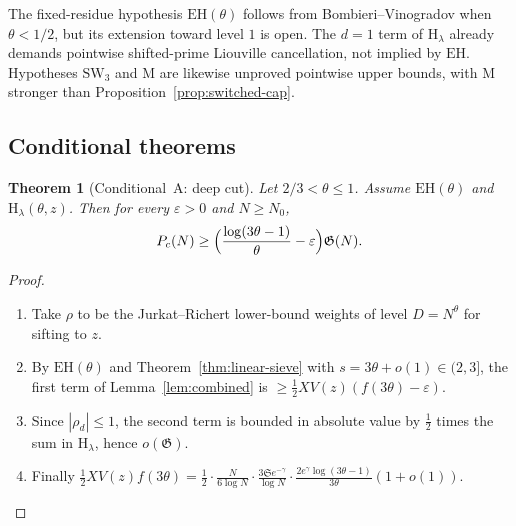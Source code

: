 \documentclass[final,11pt]{elsarticle}
\newtheorem{theorem}{Theorem}[section]
\theoremstyle{definition}
\theoremstyle{remark}
\newcommand{\Sg}{\mathfrak{S}}
\newcommand{\GG}{\mathfrak{G}}
\newcommand{\eps}{\varepsilon}
\numberwithin{equation}{section}
\begin{document}
The fixed-residue hypothesis $\mathrm{EH}(\theta)$ follows from
Bombieri--Vinogradov when $\theta<1/2$, but its extension toward level
$1$ is open. The $d=1$ term of $\mathrm H_\lambda$ already demands
pointwise shifted-prime Liouville cancellation, not implied by
$\mathrm{EH}$. Hypotheses $\mathrm{SW}_3$ and $\mathrm M$ are likewise
unproved pointwise upper bounds, with $\mathrm M$ stronger than
Proposition~\ref{prop:switched-cap}.

\subsection{Conditional theorems}

\begin{theorem}[Conditional~A: deep cut]\label{thm:condA}
Let $2/3<\theta\le1$. Assume $\mathrm{EH}(\theta)$ and $\mathrm{H}_\lambda(\theta,z)$. Then for every $\eps>0$ and $N\ge N_0$,
\[
P_c(N)\ge\Bigl(\frac{\log(3\theta-1)}{\theta}-\eps\Bigr)\GG(N).
\]

\end{theorem}

\begin{proof}
\begin{enumerate}
\item Take $\rho$ to be the Jurkat--Richert lower-bound weights of level $D=N^\theta$ for sifting to $z$.
\item By $\mathrm{EH}(\theta)$ and Theorem~\ref{thm:linear-sieve} with $s=3\theta+o(1)\in(2,3]$, the first term of Lemma~\ref{lem:combined} is $\ge\frac12XV(z)(f(3\theta)-\eps)$.
\item Since $|\rho_d|\le1$, the second term is bounded in absolute value by $\frac12$ times the sum in $\mathrm{H}_\lambda$, hence $o(\GG)$.
\item Finally $\frac12XV(z)f(3\theta)=\frac12\cdot\frac{N}{6\log N}\cdot\frac{3\Sg e^{-\gamma}}{\log N}\cdot\frac{2e^\gamma\log(3\theta-1)}{3\theta}(1+o(1))$. \qedhere
\end{enumerate}
\end{proof}
\end{document}
